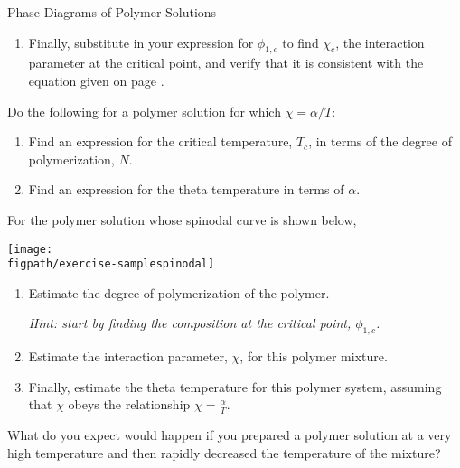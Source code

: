 \begin{activity}{Phase Diagrams of Polymer Solutions}
\begin{exercises}
\begin{enumerate}
				Set this expression equal to zero and solve for $\chi$ in terms of $\phi_1$.
				
			\item Finally, substitute in your expression for $\phi_{1,c}$ to find $\chi_c$, the interaction parameter at the critical point, and verify that it is consistent with the equation given on page \pageref{\labelbase:infobox:critpt}.
				
		\end{enumerate}
		
	\exercise Do the following for a polymer solution for which $\chi = \alpha/T$:
		
		\begin{enumerate}
			\item Find an expression for the critical temperature, $T_c$, in terms of the degree of polymerization, $N$.
			\item Find an expression for the theta temperature  in terms of $\alpha$.
		\end{enumerate}
		
	\exercise For the polymer solution whose spinodal curve is shown below,
	
		\centerline{\texttt{[image: \\figpath/exercise-samplespinodal]}}
	
		\begin{enumerate}
			\item Estimate the degree of polymerization of the polymer.
				
				\emph{Hint: start by finding the composition at the critical point, $\phi_{1,c}$.}
			
				\begin{solution}\end{solution}
				
			\item Estimate the interaction parameter, $\chi$, for this polymer mixture.
			
			\item Finally, estimate the theta temperature for this polymer system, assuming that $\chi$ obeys the relationship $\chi = \frac{\alpha}{T}$.
			
				\begin{solution}\end{solution}
			
		\end{enumerate}
		
	\exercise What do you expect would happen if you prepared a polymer solution at a very high temperature and then rapidly decreased the temperature of the mixture?
		
\end{exercises}
	
\end{activity}